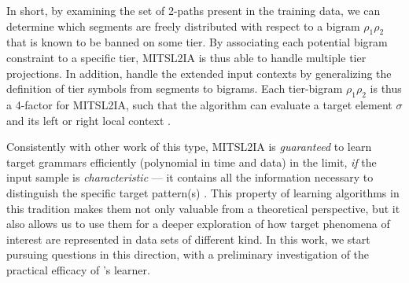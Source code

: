 \documentclass[11pt]{article}
\begin{document}
In short, by examining the set of 2-paths present in the training data, we can determine
which segments are freely distributed with respect to a bigram $\rho_1\rho_2$ that is known to be
banned on some tier. 
By associating each potential bigram constraint to a specific tier, MITSL2IA is thus able to handle multiple tier projections.
In addition, \citet{de2021learning} handle the extended input contexts by generalizing the definition of tier symbols from segments to bigrams.\@
Each tier-bigram $\rho_1\rho_2$ is thus a 4-factor for MITSL2IA, such that the algorithm can evaluate a target element $\sigma$ and its left or right local context \citep[see][for technical details]{de2021learning}.
%

Consistently with other work of this type, MITSL2IA is \emph{guaranteed} to learn target grammars efficiently (polynomial in time and data) in the limit, \emph{if} the input sample is \emph{characteristic} --- it contains all the information necessary to distinguish the specific target pattern(s)  \citep{Higuera2010grammatical}.
This property of learning algorithms in this tradition makes them not only valuable from a theoretical perspective, but it also allows us to use them for a deeper exploration of how target phenomena of interest are represented in data sets of different kind.
In this work, we start pursuing questions in this direction, with a preliminary investigation of the practical efficacy of \citet{de2021learning}'s learner.
\end{document}
